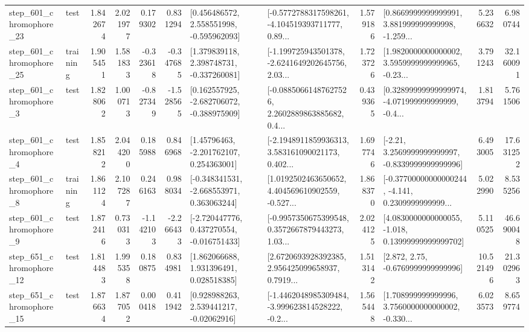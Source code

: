 \begin{tabular}{llrrrrllrlrr}
  step\_601\_chromophore\_23 &      test &      1.842674 &    2.021977 &      0.179302 &  0.831294 &    [0.456486572, 2.558551998, -0.595962093] &  [-0.5772788317598261, -4.104519393711777, 0.89... &       1.579186 &  [0.8669999999999991, 3.881999999999998, -1.259... &            5.236632 &          6.980744 \\
  step\_601\_chromophore\_25 &  training &      1.905451 &    1.581833 &     -0.323618 & -0.347685 &    [1.379839118, 2.398748731, -0.337260081] &  [-1.199725943501378, -2.6241649202645756, 2.03... &       1.723726 &  [1.9820000000000002, 3.5959999999999965, -0.23... &            3.791243 &         32.160091 \\
   step\_601\_chromophore\_3 &      test &      1.828062 &    1.000713 &     -0.827349 & -1.528565 &   [0.162557925, -2.682706072, -0.388975909] &  [-0.08850661487627526, 2.2602889863885682, 0.4... &       0.439365 &  [0.32899999999999974, -4.071999999999999, -0.4... &            1.813794 &          5.761506 \\
   step\_601\_chromophore\_4 &      test &      1.858212 &    2.044200 &      0.185988 &  0.846968 &     [1.45796463, -2.201762107, 0.254363001] &  [-2.1948911859936313, 3.583161090021173, 0.402... &       1.697746 &   [-2.21, 3.2569999999999997, -0.8339999999999996] &            6.493005 &         17.631252 \\
   step\_601\_chromophore\_8 &  training &      1.861124 &    2.107287 &      0.246163 &  0.988034 &   [-0.348341531, -2.668553971, 0.363063244] &  [1.0192502463650652, 4.404569610902559, -0.527... &       1.868370 &  [-0.37700000000000244, -4.141, 0.2309999999999... &            5.022990 &          8.535256 \\
   step\_601\_chromophore\_9 &      test &      1.872416 &    0.730313 &     -1.142103 & -2.266433 &   [-2.720447776, 0.437270554, -0.016751433] &  [-0.9957350675399548, 0.3572667879443273, 1.03... &       2.024125 &  [4.0830000000000055, -1.018, 0.13999999999999702] &            5.110525 &         46.690048 \\
  step\_651\_chromophore\_12 &      test &      1.814483 &    1.995358 &      0.180875 &  0.834981 &     [1.862066688, 1.931396491, 0.028518385] &  [2.6720693928392385, 2.956425099658937, 0.7919... &       1.513142 &                 [2.872, 2.75, -0.6769999999999996] &           10.521496 &         21.302963 \\
  step\_651\_chromophore\_15 &      test &      1.876634 &    1.877052 &      0.000418 &  0.411942 &     [0.928988263, 2.539441217, -0.02062916] &  [-1.4462048985309484, -3.999623814528222, -0.2... &       1.565448 &  [1.708999999999996, 3.7560000000000002, -0.330... &            6.023573 &          8.659774 \\

\end{tabular}
